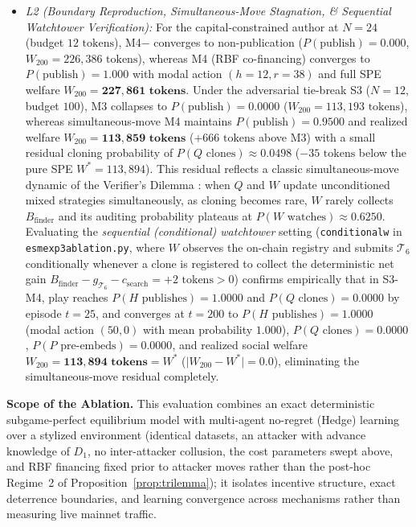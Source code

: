 \documentclass[runningheads,a4paper]{llncs}
\renewcommand{\_}{\textunderscore\allowbreak}
\begin{document}
\begin{itemize}
  \item \emph{L2 (Boundary Reproduction, Simultaneous-Move Stagnation, \& Sequential Watchtower Verification):} For the capital-constrained author at $N = 24$ (budget $12\text{ tokens}$), M4$-$ converges to non-publication ($P(\text{publish}) = 0.000$, $W_{200} = 226,386\text{ tokens}$), whereas M4 (RBF co-financing) converges to $P(\text{publish}) = \mathbf{1.000}$ with modal action $(h = 12,\allowbreak r = 38)$ and full SPE welfare $W_{200} = \mathbf{227,861\text{ tokens}}$. Under the adversarial tie-break S3 ($N = 12$, budget $100$), M3 collapses to $P(\text{publish}) = 0.0000$ ($W_{200} = 113,193\text{ tokens}$), whereas simultaneous-move M4 maintains $P(\text{publish}) = \mathbf{0.9500}$ and realized welfare $W_{200} = \mathbf{113,859\text{ tokens}}$ ($+666\text{ tokens}$ above M3) with a small residual cloning probability of $P(Q\text{ clones}) \approx 0.0498$ ($-35\text{ tokens}$ below the pure SPE $W^* = 113,894$). This residual reflects a classic simultaneous-move dynamic of the Verifier's Dilemma \cite{luu2015}: when $Q$ and $W$ update unconditioned mixed strategies simultaneously, as cloning becomes rare, $W$ rarely collects $B_{\text{finder}}$ and its auditing probability plateaus at $P(W\text{ watches}) \approx 0.6250$. Evaluating the \emph{sequential (conditional) watchtower} setting (\texttt{conditional\_w} in \texttt{esm\_exp3\_ablation.py}, where $W$ observes the on-chain registry and submits $\mathcal{T}_6$ conditionally whenever a clone is registered to collect the deterministic net gain $B_{\text{finder}} - g_{\mathcal{T}_6} - c_{\text{search}} = +2\text{ tokens} > 0$) confirms empirically that in S3-M4, play reaches $P(H\text{ publishes}) = \mathbf{1.0000}$ and $P(Q\text{ clones}) = \mathbf{0.0000}$ by episode $t = 25$, and converges at $t = 200$ to $P(H\text{ publishes}) = \mathbf{1.0000}$ (modal action $(50,\allowbreak 0)$ with mean probability $1.000$), $P(Q\text{ clones}) = \mathbf{0.0000}$, $P(P\text{ pre-embeds}) = \mathbf{0.0000}$, and realized social welfare $W_{200} = \mathbf{113,894\text{ tokens}} = W^*$ ($\vert{}W_{200} - W^*\vert{} = \mathbf{0.0}$), eliminating the simultaneous-move residual completely.
\end{itemize}

\textbf{Scope of the Ablation.} This evaluation combines an exact deterministic subgame-perfect equilibrium model with multi-agent no-regret (Hedge) learning over a stylized environment (identical datasets, an attacker with advance knowledge of $D_1$, no inter-attacker collusion, the cost parameters swept above, and RBF financing fixed prior to attacker moves rather than the post-hoc Regime~2 of Proposition~\ref{prop:trilemma}); it isolates incentive structure, exact deterrence boundaries, and learning convergence across mechanisms rather than measuring live mainnet traffic.
\end{document}
